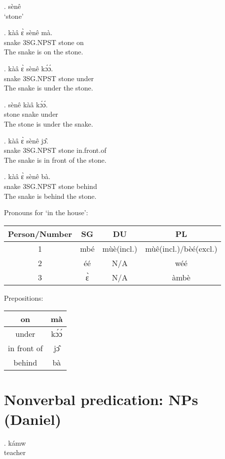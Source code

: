 \documentclass{assets/fieldnotes}
\begin{document}
{\ex. sènê\\
    `stone'

\exg. kàâ ɛ̀ sènê mà.\\
    snake 3SG.NPST stone on\\
    The snake is on the stone.


\exg. kàâ ɛ̀ sènê kɔ́ɔ́.\\
    snake 3SG.NPST stone under\\
    The snake is under the stone.

\exg. sènê kàâ kɔ́ɔ́.\\
    stone snake under\\
    The stone is under the snake.

\exg. kàâ ɛ̀ sènê jɔ̂.\\
    snake 3SG.NPST stone in.front.of\\
    The snake is in front of the stone.

\exg. kàâ ɛ̀ sènê bà.\\
    snake 3SG.NPST stone behind\\
    The snake is behind the stone.

Pronouns for `in the house':
\begin{center}
    \begin{tabular}{|c|c|c|c|}
    \hline
    Person/Number & SG & DU & PL \\ \hline
    1 & mbé & mùè(incl.) & mùê(incl.)/bèé(excl.) \\ \hline
    2 & éé & N/A & wéé \\ \hline
    3 & ɛ̀ & N/A & àmbè \\ \hline
    \end{tabular}
\end{center}
Prepositions:
\begin{center}
    \begin{tabular}{|c|c|}
    \hline
    on & mà\\ \hline
    under & kɔ́ɔ́\\ \hline
    in front of & jɔ̂\\ \hline
    behind & bà\\ \hline
    \end{tabular}
\end{center}

\section{Nonverbal predication: NPs (Daniel)}
\ex. kámw\\
teacher

}
\end{document}

